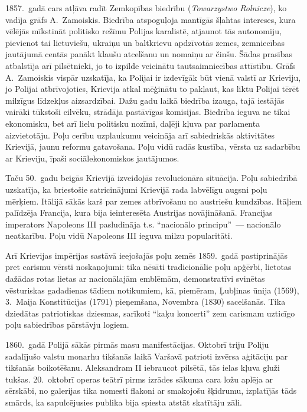 \documentclass[twoside,a5paper,12pt,fleqn,openany]{extbook}
\newcommand{\pltxti}[1]{\textit{\textpolish{#1}}}
\begin{document}
1857.~gadā cars atļāva radīt Zemkopības biedrību (\pltxti{Towarzystwo Rolnicze}), ko vadīja grāfs A.~Zamoiskis. Biedrība atspoguļoja mantīgās šļahtas intereses, kura vēlējās mīkstināt politisko režīmu Polijas karalistē, atjaunot tās autonomiju, pievienot tai lietuviešu, ukraiņu un baltkrievu apdzīvotās zemes, zemniecības jautājumā centās panākt klaušu atcelšanu un nomaiņu ar činšu. Šādas prasības atbalstīja arī pilsētnieki, jo to izpilde veicinātu tautsaimniecības attīstību. Grāfs A.~Zamoiskis vispār uzskatīja, ka Polijai ir izdevīgāk būt vienā valstī ar Krieviju, jo Polijai atbrīvojoties, Krievija atkal mēģinātu to pakļaut, kas liktu Polijai tērēt milzīgus līdzekļus aizsardzībai. Dažu gadu laikā biedrība izauga, tajā iestājās vairāki tūkstoši cilvēku, strādāja pastāvīgas komisijas. Biedrība ieguva ne tikai ekonomisku, bet arī lielu politisku nozīmi, daļēji kļuva par parlamenta aizvietotāju. Poļu cerību uzplaukumu veicināja arī sabiedriskās aktivitātes Krievijā, jaunu reformu gatavošana. Poļu vidū radās kustība, vērsta uz sadarbību ar Krieviju, īpaši sociālekonomiskos jautājumos.

Taču 50.~gadu beigās Krievijā izveidojās revolucionāra situācija. Poļu sabiedrībā uzskatīja, ka briestošie satricinājumi Krievijā rada labvēlīgu augsni poļu mērķiem. Itālijā sākās karš par zemes atbrīvošanu no austriešu kundzības. Itāļiem palīdzēja Francija, kura bija ieinteresēta Austrijas novājināšanā. Francijas imperators Napoleons III pasludināja t.s. ``nacionālo principu''~--- nacionālo neatkarību. Poļu vidū Napoleons III ieguva milzu popularitāti.

Arī Krievijas impērijas sastāvā ieejošajās poļu zemēs 1859.~gadā pastiprinājās pret carismu vērsti noskaņojumi: tika nēsāti tradicionālie poļu apģērbi, lietotas dažādas rotas lietas ar nacionālajām emblēmām, demonstratīvi svinētas vēsturiskas gadadienas tādiem notikumiem, kā, piemēram, Ļubļinas ūnija (1569), 3.~Maija Konstitūcijas (1791) pieņemšana, Novembra (1830) sacelšanās. Tika dziedātas patriotiskas dziesmas, sarīkoti ``kaķu koncerti'' zem carismam uzticīgo poļu sabiedrības pārstāvju logiem.

1860.~gadā Polijā sākās pirmās masu manifestācijas. Oktobrī triju Poliju sadalījušo valstu monarhu tikšanās laikā Varšavā patrioti izvērsa aģitāciju par tikšanās boikotēšanu. Aleksandram II iebraucot pilsētā, tās ielas kļuva gluži tukšas. 20.~oktobrī operas teātrī pirms izrādes sākuma cara ložu aplēja ar sērskābi, no galerijas tika nomesti flakoni ar smakojošu šķidrumu, izplatījās tāds smārds, ka sapulcējusies publika bija spiesta atstāt skatītāju zāli.
\end{document}

